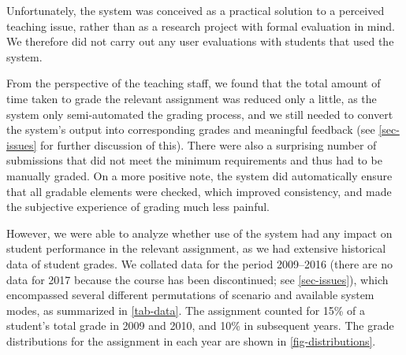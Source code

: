 \documentclass[sigconf, review, anonymous, capitalise]{acmart}
\begin{document}
Unfortunately, the system was conceived as a practical solution to a perceived teaching issue, rather than as a research project with formal evaluation in mind. We therefore did not carry out any user evaluations with students that used the system.

From the perspective of the teaching staff, we found that the total amount of time taken to grade the relevant assignment was reduced only a little, as the system only semi-automated the grading process, and we still needed to convert the system's output into corresponding grades and meaningful feedback (see \cref{sec-issues} for further discussion of this). There were also a surprising number of submissions that did not meet the minimum requirements and thus had to be manually graded. On a more positive note, the system did automatically ensure that all gradable elements were checked, which improved consistency, and made the subjective experience of grading much less painful.

However, we were able to analyze whether use of the system had any impact on student performance in the relevant assignment, as we had extensive historical data of student grades. We collated data for the period 2009--2016 (there are no data for 2017 because the course has been discontinued; see \cref{sec-issues}), which encompassed several different permutations of scenario and available system modes, as summarized in \cref{tab-data}. The assignment counted for 15\% of a student's total grade in 2009 and 2010, and 10\% in subsequent years. The grade distributions for the assignment in each year are shown in \cref{fig-distributions}.
\end{document}
